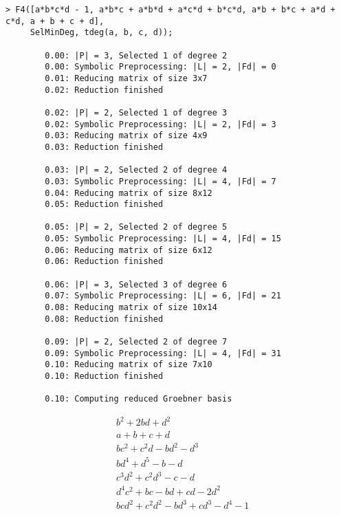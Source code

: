 \begin{Verbatim}[fontsize=\footnotesize]
> F4([a*b*c*d - 1, a*b*c + a*b*d + a*c*d + b*c*d, a*b + b*c + a*d + c*d, a + b + c + d],
     SelMinDeg, tdeg(a, b, c, d));

        0.00: |P| = 3, Selected 1 of degree 2
        0.00: Symbolic Preprocessing: |L| = 2, |Fd| = 0
        0.01: Reducing matrix of size 3x7
        0.02: Reduction finished

        0.02: |P| = 2, Selected 1 of degree 3
        0.02: Symbolic Preprocessing: |L| = 2, |Fd| = 3
        0.03: Reducing matrix of size 4x9
        0.03: Reduction finished

        0.03: |P| = 2, Selected 2 of degree 4
        0.03: Symbolic Preprocessing: |L| = 4, |Fd| = 7
        0.04: Reducing matrix of size 8x12
        0.05: Reduction finished

        0.05: |P| = 2, Selected 2 of degree 5
        0.05: Symbolic Preprocessing: |L| = 4, |Fd| = 15
        0.06: Reducing matrix of size 6x12
        0.06: Reduction finished

        0.06: |P| = 3, Selected 3 of degree 6
        0.07: Symbolic Preprocessing: |L| = 6, |Fd| = 21
        0.08: Reducing matrix of size 10x14
        0.08: Reduction finished

        0.09: |P| = 2, Selected 2 of degree 7
        0.09: Symbolic Preprocessing: |L| = 4, |Fd| = 31
        0.10: Reducing matrix of size 7x10
        0.10: Reduction finished

        0.10: Computing reduced Groebner basis
\end{Verbatim}
\begin{eqnarray*}
	&  b^2+2bd+d^2\\
	&  a+b+c+d\\
	&  bc^2+c^2d-bd^2-d^3\\
	&  bd^4+d^5-b-d\\
	&  c^3d^2+c^2d^3-c-d\\
	&  d^4c^2+bc-bd+cd-2d^2\\
	&  bcd^2+c^2d^2-bd^3+cd^3-d^4-1
\end{eqnarray*}

